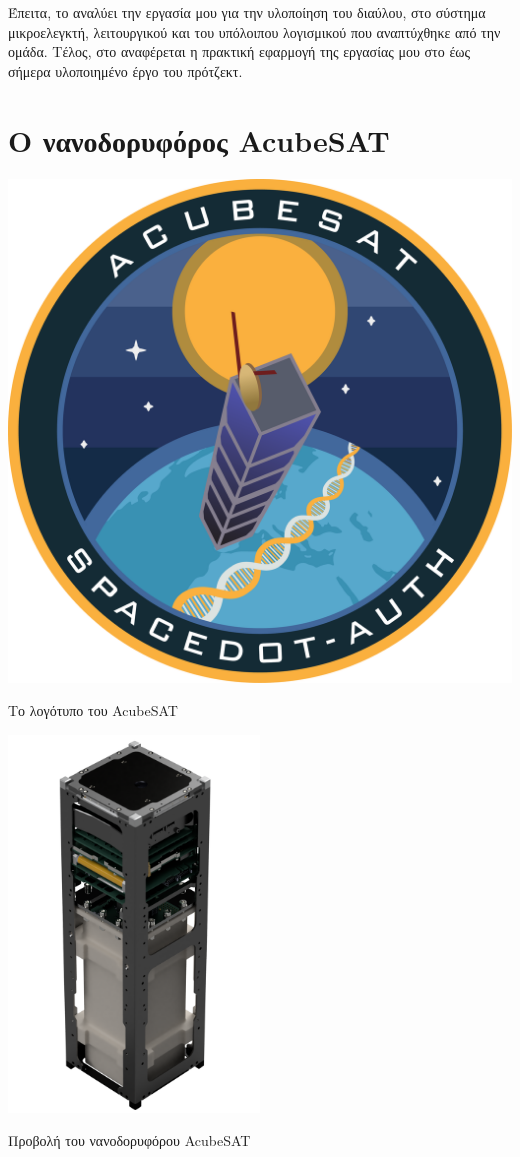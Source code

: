 \documentclass[a4paper,nobib,justified]{tufte-book}
\begin{document}
\par Έπειτα, το  αναλύει την εργασία μου για την υλοποίηση του διαύλου, στο σύστημα μικροελεγκτή, λειτουργικού και του υπόλοιπου λογισμικού που αναπτύχθηκε από την ομάδα. Τέλος, στο  αναφέρεται η πρακτική εφαρμογή της εργασίας μου στο έως σήμερα υλοποιημένο έργο του πρότζεκτ.

\chapter{Ο νανοδορυφόρος AcubeSAT}
\label{chap:acubesat}

\begin{marginfigure}
	\centering
	\includegraphics{media/acubesat_patch.pdf}
	\caption{Το λογότυπο του AcubeSAT}
	\label{acubesat-logo}

	\includegraphics[height=10cm]{media/images/acubesat-new.png}
	\caption{Προβολή του νανοδορυφόρου AcubeSAT}
	\label{acubesat-render}
\end{marginfigure}
\end{document}
